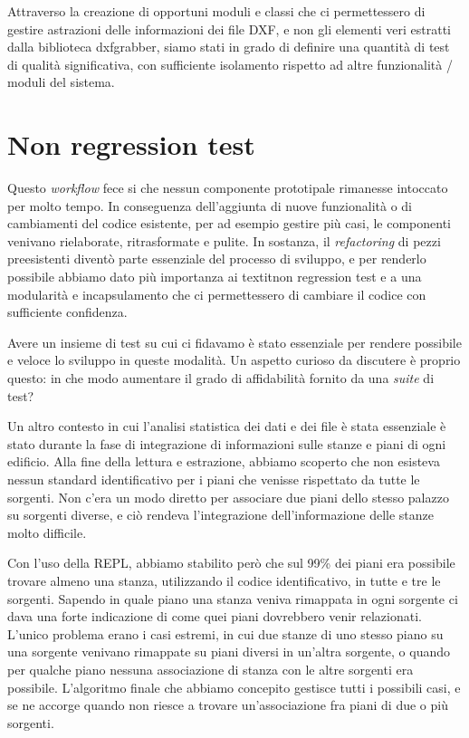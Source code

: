 \documentclass[12pt]{report}
\begin{document}
Attraverso la creazione di opportuni moduli e classi che ci permettessero di gestire astrazioni delle informazioni dei file DXF, e non gli elementi veri estratti dalla biblioteca dxfgrabber, siamo stati in grado di definire una quantità di test di qualità significativa, con sufficiente isolamento rispetto ad altre funzionalità / moduli del sistema.

\section{Non regression test}

Questo \textit{workflow} fece si che nessun componente prototipale rimanesse intoccato per molto tempo. In conseguenza dell'aggiunta di nuove funzionalità o di cambiamenti del codice esistente, per ad esempio gestire più casi, le componenti venivano rielaborate, ritrasformate e pulite. In sostanza, il \textit{refactoring} di pezzi preesistenti diventò parte essenziale del processo di sviluppo, e per renderlo possibile abbiamo dato più importanza ai textit{non regression test} e a una modularità e incapsulamento che ci permettessero di cambiare il codice con sufficiente confidenza. 

Avere un insieme di test su cui ci fidavamo è stato essenziale per rendere possibile e veloce lo sviluppo in queste modalità. Un aspetto curioso da discutere è proprio questo: in che modo aumentare il grado di affidabilità fornito da una \textit{suite} di test?

Un altro contesto in cui l'analisi statistica dei dati e dei file è stata essenziale è stato durante la fase di integrazione di informazioni sulle stanze e piani di ogni edificio. Alla fine della lettura e estrazione, abbiamo scoperto che non esisteva nessun standard identificativo per i piani che venisse rispettato da tutte le sorgenti. Non c'era un modo diretto per associare due piani dello stesso palazzo su sorgenti diverse, e ciò rendeva l'integrazione dell'informazione delle stanze molto difficile.

Con l'uso della REPL, abbiamo stabilito però che sul 99\% dei piani era possibile trovare almeno una stanza, utilizzando il codice identificativo, in tutte e tre le sorgenti. Sapendo in quale piano una stanza veniva rimappata in ogni sorgente ci dava una forte indicazione di come quei piani dovrebbero venir relazionati. L'unico problema erano i casi estremi, in cui due stanze di uno stesso piano su una sorgente venivano rimappate su piani diversi in un'altra sorgente, o quando per qualche piano nessuna associazione di stanza con le altre sorgenti era possibile. L'algoritmo finale che abbiamo concepito gestisce tutti i possibili casi, e se ne accorge quando non riesce a trovare un'associazione fra piani di due o più sorgenti. 
\end{document}
